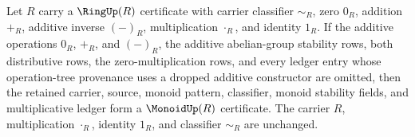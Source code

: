 \begin{proposition}
\label{prop:ring-forgets-monoid-certificate}
Let $R$ carry a $\RingUp(R)$ certificate with carrier classifier $\sim_R$, zero $0_R$, addition $+_R$, additive inverse $(-)_R$, multiplication $\cdot_R$, and identity $1_R$. If the additive operations $0_R$, $+_R$, and $(-)_R$, the additive abelian-group stability rows, both distributive rows, the zero-multiplication rows, and every ledger entry whose operation-tree provenance uses a dropped additive constructor are omitted, then the retained carrier, source, monoid pattern, classifier, monoid stability fields, and multiplicative ledger form a $\MonoidUp(R)$ certificate. The carrier $R$, multiplication $\cdot_R$, identity $1_R$, and classifier $\sim_R$ are unchanged.
\end{proposition}
